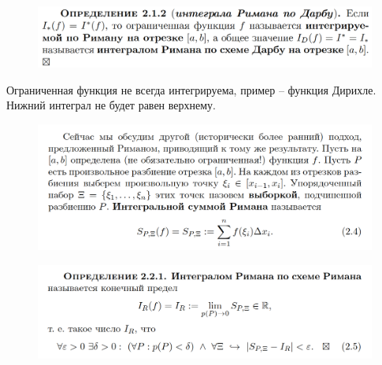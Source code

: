 \documentclass{article}
\begin{document}
\begin{figure}[h!]
    \centering
    \includegraphics[width=\textwidth]{59.png}
    \vspace{-1cm}
\end{figure}
Ограниченная функция не всегда интегрируема, пример -- функция Дирихле. Нижний интеграл не будет равен верхнему.
\begin{figure}[h!]
    \centering
    \includegraphics[width=\textwidth]{61.png}
    \vspace{-1cm}
\end{figure}
\begin{figure}[h!]
    \centering
    \includegraphics[width=\textwidth]{62.png}
    \vspace{-1cm}
\end{figure}
\newpage
\end{document}
